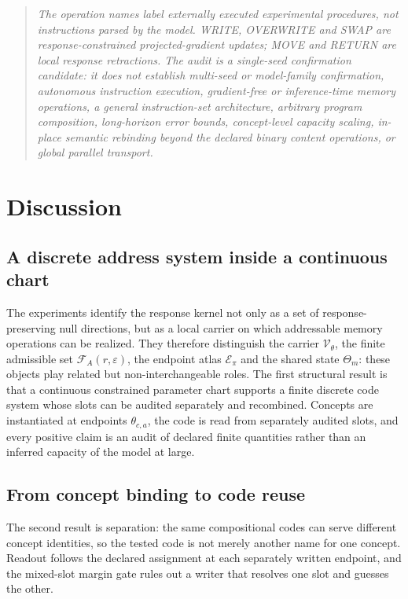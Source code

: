\documentclass[11pt]{article}
\newenvironment{scopebox}{\begin{quote}\small\itshape}{\end{quote}}
\begin{document}
\begin{scopebox}
The operation names label externally executed experimental procedures, not instructions parsed by the model.
WRITE, OVERWRITE and SWAP are response-constrained projected-gradient updates; MOVE and RETURN are local
response retractions. The audit is a single-seed confirmation candidate: it does not establish multi-seed or
model-family confirmation, autonomous instruction execution, gradient-free or inference-time memory operations,
a general instruction-set architecture, arbitrary program composition, long-horizon error bounds, concept-level
capacity scaling, in-place semantic rebinding beyond the declared binary content operations, or global parallel
transport.
\end{scopebox}

\section{Discussion}

\subsection{A discrete address system inside a continuous chart}

The experiments identify the response kernel not only as a set of response-preserving null directions, but as a
local carrier on which addressable memory operations can be realized. They therefore distinguish the carrier
$\mathcal{V}_\theta$, the finite admissible set $\mathcal{F}_A(r,\varepsilon)$, the endpoint atlas
$\mathcal{E}_\pi$ and the shared state $\Theta_m$: these objects play related but non-interchangeable roles. The first structural result is that a
continuous constrained parameter chart supports a finite discrete code system whose slots can be audited
separately and recombined. Concepts are instantiated at endpoints
$\theta_{c,a}$, the code is read from separately audited slots, and every positive claim is an audit of
declared finite quantities rather than an inferred capacity of the model at large.

\subsection{From concept binding to code reuse}

The second result is separation: the same compositional codes can serve different concept identities, so the
tested code is not merely another name for one concept. Readout follows the declared assignment at each
separately written endpoint, and the mixed-slot margin gate rules out a writer that resolves one slot and
guesses the other.
\end{document}
